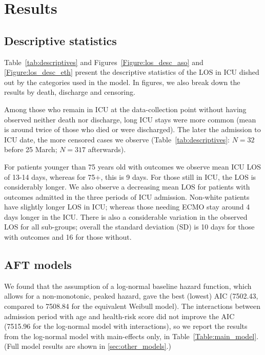 \documentclass[review]{elsarticle}
\begin{document}
\section{Results}

\subsection{Descriptive statistics}

Table~\ref{tab:descriptives} and Figures~\ref{Figure:los_desc_aso} and \ref{Figure:los_desc_eth} present the descriptive statistics of the LOS in ICU dished out by the categories used in the model. In figures, we also break down the results by death, discharge and censoring. 

Among those who remain in ICU at the data-collection point without having observed neither death nor discharge, long ICU stays were more common (mean is around twice of those who died or were discharged). The later the admission to ICU date, the more censored cases we observe (Table~\ref{tab:descriptives}: $N=32$ before 25 March; $N=317$ afterwards).
 
For patients younger than 75 years old with outcomes we observe mean ICU LOS of 13-14 days, whereas for 75+, this is 9 days. For those still in ICU, the LOS is considerably longer. We also observe a decreasing mean LOS for patients with outcomes admitted in the three periods of ICU admission. Non-white patients have slightly longer LOS in ICU; whereas those needing ECMO stay around 4 days longer in the ICU. There is also a considerable variation in the observed LOS for all sub-groups; overall the standard deviation (SD) is 10 days for those with outcomes and 16 for those without. 

\subsection{AFT models}


We found that the assumption of a log-normal baseline hazard function, which allows for a non-monotonic, peaked hazard, gave the best (lowest) AIC (7502.43, compared to 7508.84 for the equivalent Weibull model). The interactions between admission period with age and health-risk score did not improve the AIC (7515.96 for the log-normal model with interactions), so we report the results from the log-normal model with main-effects only, in Table~\ref{Table:main_model}. (Full model results are shown in \ref{sec:other_models}.) 
\end{document}
